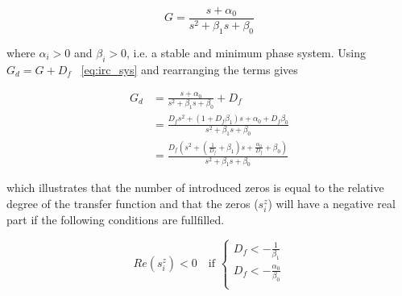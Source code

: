 \begin{equation}
  \label{eq:irc_sys}
  G = \frac{s + \alpha_0}{s^2 + \beta_1s + \beta_0}
\end{equation}

where  $\alpha_i > 0$ and  $\beta_i > 0$, i.e. a stable and minimum phase system.  Using $G_d = G + D_f$  ~\eqref{eq:irc_sys} and rearranging the terms gives

\begin{equation}
  \label{eq:irc_sys_d}
  \begin{split}
  G_d & = \frac{s + \alpha_0}{s^2 + \beta_1s + \beta_0} + D_f \\
      & = \frac{D_fs^2 + (1 + D_f\beta_1)s + \alpha_0 + D_f\beta_0}{s^2 + \beta_1s + \beta_0} \\
      & = \frac{D_f(s^2 + (\frac{1}{D_f} + \beta_1)s + \frac{\alpha_0}{D_f} + \beta_0)}{s^2 + \beta_1s + \beta_0}
  \end{split}
\end{equation}

which illustrates that the number of introduced zeros is equal to the relative degree of the transfer function and that the zeros ($s^z_i$) will have a negative real part if the following conditions are fullfilled.

\begin{equation}
  \label{eq:irc_cond}
  Re(s^z_i) < 0 \quad \text{if }
  \begin{cases}
    D_f < -\frac{1}{\beta_1}\\
    D_f < -\frac{\alpha_0}{\beta_0}\\
  \end{cases}
\end{equation}





